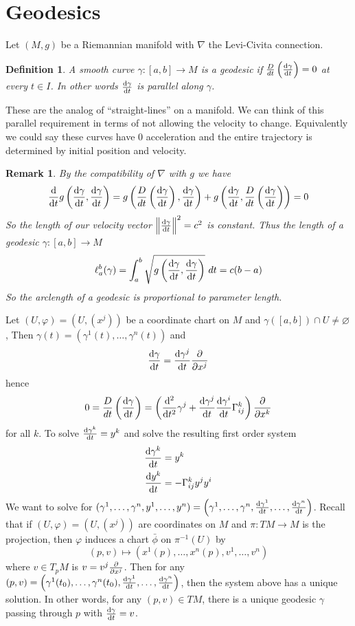 \documentclass[a4paper]{article}
\newtheorem*{defn}{Definition}
\newtheorem*{rem}{Remark}
\begin{document}
\section*{Geodesics}%
Let $(M,g)$ be a Riemannian manifold with $\nabla$ the Levi-Civita connection.

\begin{defn}
  A smooth curve $\gamma: [a,b] \rightarrow M$ is a geodesic if $\frac{D}{dt} \left( \dv{\gamma}{t} \right) =0$ at every $t \in I$. In other words $\dv{\gamma}{t}$ is parallel along $\gamma$.
\end{defn}
These are the analog of ``straight-lines'' on a manifold. We can think of this parallel requirement in terms of not allowing the velocity to change. Equivalently we could say these curves have 0 acceleration and the entire trajectory is determined by initial position and velocity. 

\begin{rem}
 By the compatibility of $\nabla$ with $g$ we have 
 \[
   \dv{t} g \left( \dv{\gamma}{t}, \dv{\gamma}{t} \right) = g \left( \frac{D}{dt} \left( \dv{\gamma}{t} \right),  \dv{\gamma}{t} \right) + g \left(\dv{\gamma}{t}, \frac{D}{dt} \left( \dv{\gamma}{t} \right)\right) = 0
 \]
 So the length of our velocity vector $\norm{\dv{\gamma}{t}}^2 = c^2$ is constant. Thus the length of a geodesic $\gamma: [a,b] \rightarrow M$
 \[
   \ell_a^b(\gamma) = \int_a^b \sqrt{ g \left( \dv{\gamma}{t}, \dv{\gamma}{t} \right)}\ dt = c(b-a)
 \]
 So the arclength of a geodesic is proportional to parameter length.
\end{rem}

Let $(U,\varphi) = (U, (x^j))$ be a coordinate chart on $M$ and $\gamma([a,b]) \cap U \neq \varnothing$, Then $\gamma(t) = (\gamma^1(t), \dots, \gamma^n(t))$ and 
\[
  \dv{\gamma}{t} = \dv{\gamma^j}{t} \pdv{x^j}
\]
hence 
\[
  0 = \frac{D}{dt} \left( \dv{\gamma}{t} \right) = \left(\dv[2]{t} \gamma^j + \dv{\gamma^j}{t}\dv{\gamma^i}{t} \Gamma_{ij}^k\right) \pdv{x^k}
\]
for all $k$. To solve $\dv{\gamma^k}{t} = y^k$ and solve the resulting first order system
\[
  \begin{aligned}
    \dv{\gamma^k}{t} &= y^k  \\
    \dv{y^k}{t} &= -\Gamma_{ij}^ky^jy^i
  \end{aligned}
\]
We want to solve for $(\gamma^1, \dots, \gamma^n, y^1, \dots, y^n) = \left( \gamma^1, \dots, \gamma^n, \dv{\gamma^1}{t}, \dots, \dv{\gamma^n}{t} \right)$. Recall that if $(U, \varphi) = (U, (x^j))$ are coordinates on $M$ and $\pi: TM \rightarrow M$ is the projection, then $\varphi$ induces a chart $\bar{\phi}$ on $\pi^{-1}(U)$ by 
\[
  (p,v) \mapsto (x^1(p), \dots, x^n(p), v^1, \dots, v^n)
\]
where $v \in T_pM$ is $v = v^j \pdv{x^j}$. Then for any $(p,v) = \left(\gamma^1(t_0), \dots, \gamma^n(t_0),\dv{\gamma^1}{t}(t_0), \dots, \dv{\gamma^n}{t}(t_0)\right)$, then the system above has a unique solution. In other words, for any $(p,v) \in TM$, there is a unique geodesic $\gamma$ passing through $p$ with $\dv{\gamma}{t} = v$.
\end{document}
